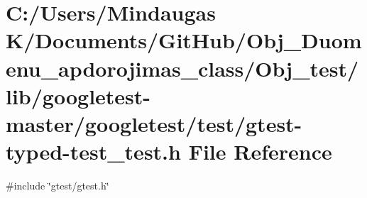 \hypertarget{_obj__test_2lib_2googletest-master_2googletest_2test_2gtest-typed-test__test_8h}{}\section{C\+:/\+Users/\+Mindaugas K/\+Documents/\+Git\+Hub/\+Obj\+\_\+\+Duomenu\+\_\+apdorojimas\+\_\+class/\+Obj\+\_\+test/lib/googletest-\/master/googletest/test/gtest-\/typed-\/test\+\_\+test.h File Reference}
\label{_obj__test_2lib_2googletest-master_2googletest_2test_2gtest-typed-test__test_8h}
{\ttfamily \#include \char`\"{}gtest/gtest.\+h\char`\"{}}\newline
